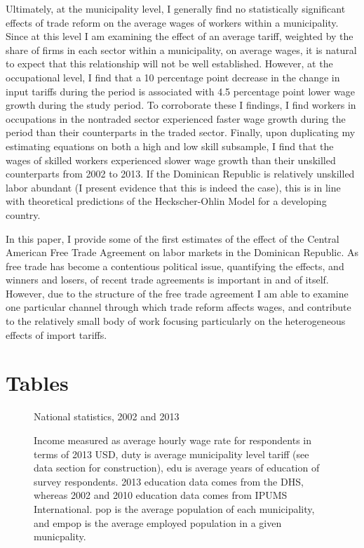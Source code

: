 \documentclass[12pt]{article}
\begin{document}
Ultimately, at the municipality level, I generally find no statistically significant effects of 
trade reform on the average wages of workers within a municipality. Since at this level I am examining
the effect of an average tariff, weighted by the share of firms in each sector within a municipality,
on average wages, it is natural to expect that this relationship will not be well established.
However, at the occupational level, I find that a 10 percentage point decrease in the change in input 
tariffs during the period is associated with 4.5 percentage point lower wage growth during the study 
period. To corroborate these I findings, I find workers in occupations in the nontraded sector experienced 
faster wage growth during the period than their counterparts in the traded sector. Finally, upon 
duplicating my estimating equations on both a high and low skill subsample, 
I find  that the wages of skilled workers experienced slower wage growth than their unskilled 
counterparts from 2002 to 2013. If the Dominican Republic is relatively unskilled labor
abundant (I present evidence that this is indeed the case), this is in line with theoretical predictions 
of the Heckscher-Ohlin Model for a developing country.

In this paper, I provide some of the first estimates of the effect of the Central American
Free Trade Agreement on labor markets in the Dominican Republic. As free trade has become 
a contentious political issue, quantifying the effects, and winners and losers, of recent trade 
agreements is important in and of itself. However, due to the structure of the free trade
agreement I am able to examine one particular channel through which trade reform affects wages,
and contribute to the relatively small body of work focusing particularly on the heterogeneous
effects of import tariffs.

\newpage
\singlespacing



\bigskip \bigskip \bigskip
\appendix
\singlespacing

\section{Tables}
\label{sec:Tables}
\fontsize{10pt}{12pt}\selectfont

\begin{figure}[H]
\begin{center}
National statistics, 2002 and 2013

\caption{\label{fig:Summary 1}}
\end{center}
Income measured
as average hourly wage rate for respondents in terms of 2013 USD, 
duty is average municipality level tariff (see data
section for construction), edu is average years of education of survey respondents. 
2013 education data comes from the DHS, whereas 2002 and 2010 education data comes
from IPUMS International. pop is the average population of each municipality,
and empop is the average employed population in a given municpality.
\end{figure}
\end{document}
